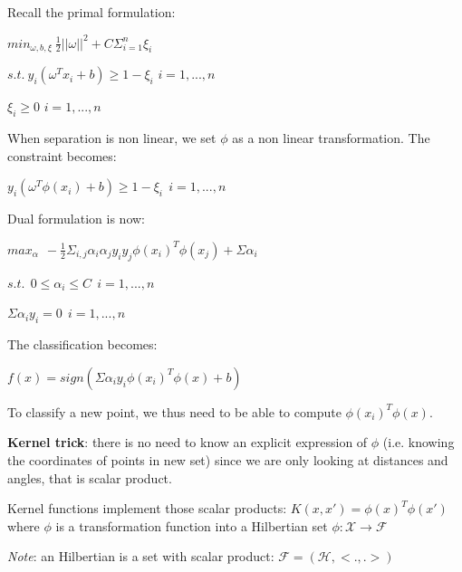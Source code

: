Recall the primal formulation:

\begin{center}
$min_{\omega,b, \xi}~\frac{1}{2}||\omega||^2+C\Sigma_{i=1}^{n}\xi_i$

$s.t.~y_i(\omega^Tx_i+b) \geq 1 - \xi_i$ $i=1,...,n$

$\xi_i \geq 0$ $i=1,...,n$
\end{center}

When separation is non linear, we set $\phi$ as a non linear transformation. The constraint becomes:

$y_i(\omega^T\phi(x_i)+b) \geq 1 - \xi_i~~i=1,...,n$

\vspace{5mm}

Dual formulation is now:

\begin{center}

$max_\alpha~~-\frac{1}{2}\Sigma_{i,j} \alpha_i \alpha_j y_i y_j \phi(x_i)^T \phi(x_j) + \Sigma \alpha_i$

$s.t.~~0 \leq \alpha_i \leq C~~i=1,...,n$

$\Sigma \alpha_i y_i = 0~~i=1,...,n$

\end{center}

\vspace{5mm}

The classification becomes:

\begin{center}
$f(x)=sign(\Sigma \alpha_i y_i \phi(x_i)^T \phi(x) + b)$
\end{center}

To classify a new point, we thus need to be able to compute $\phi(x_i)^T \phi(x)$.

\vspace{5mm}

\textbf{Kernel trick}: there is no need to know an explicit expression of $\phi$ (i.e. knowing the coordinates of points in new set) since we are only looking at distances and angles, that is scalar product.

\vspace{5mm}

Kernel functions implement those scalar products: $K(x,x')=\phi(x)^T \phi(x')$ where $\phi$ is a transformation function into a Hilbertian set $\phi : \mathcal{X} \to \mathcal{F} $

\textit{Note}: an Hilbertian is a set with scalar product: $\mathcal{F}=(\mathcal{H},<.,.>)$

